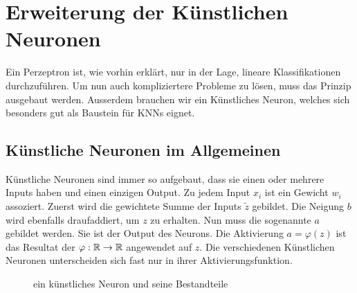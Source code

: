 \section{Erweiterung der Künstlichen Neuronen}\label{sec:künstlicheNeuronen}
Ein Perzeptron ist, wie vorhin erklärt, nur in der Lage, lineare Klassifikationen
durchzuführen. Um nun auch kompliziertere Probleme zu lösen, muss das Prinzip
ausgebaut werden. Ausserdem brauchen wir ein Künstliches Neuron, welches sich
besonders gut als Baustein für KNNs eignet.


\subsection{Künstliche Neuronen im Allgemeinen}
Künstliche Neuronen sind immer so aufgebaut, dass sie einen oder mehrere Inputs
haben und einen einzigen Output. Zu jedem Input $x_i$ ist ein Gewicht
$w_{i}$ assoziert. Zuerst wird die gewichtete Summe der Inputs $\tilde{z}$ gebildet.
Die Neigung $b$ wird ebenfalls draufaddiert, um $z$ zu erhalten. Nun muss
die sogenannte  $a$ gebildet werden. Sie ist der Output des Neurons.
Die Aktivierung $a = \varphi(z)$ ist das Resultat der
 $\varphi: \mathbb{R} \to \mathbb{R}$ angewendet
auf $z$. Die verschiedenen Künstlichen Neuronen unterscheiden
sich fast nur in ihrer Aktivierungsfunktion.
\\
\begin{figure}[h!]

  \caption{ein künstliches Neuron und seine Bestandteile}
\end{figure}
\\

\para{}
\cite{Nielsen}
\cite{wiki:kuenstliches_neuron}

